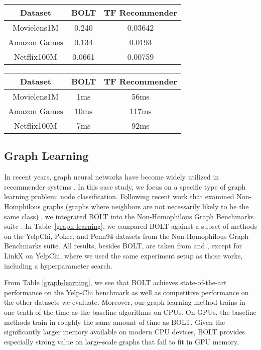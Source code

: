\documentclass[sigconf]{acmart}
\begin{document}
\begin{table}[h]
\begin{tabular}{|c|c|c|}
 \hline
 Dataset & BOLT & TF Recommender \\ \hline
 Movielens1M & 0.240 & 0.03642\\ \hline
 Amazon Games & 0.134 & 0.0193\\ \hline
 Netflix100M & 0.0661 & 0.00759\\ \hline
\end{tabular}
\label{personalization-acc}
\vspace{-1.1cm}
\end{table}
\begin{table}[h]
\begin{tabular}{|c|c|c|}
 \hline
 Dataset & BOLT & TF Recommender \\ \hline
 Movielens1M & 1ms & 56ms\\ \hline
 Amazon Games & 10ms & 117ms\\ \hline
 Netflix100M & 7ms & 92ms\\ \hline
\end{tabular}
\label{personalization-inf}
\vspace{-0.5cm}
\end{table}



\subsection{Graph Learning}
In recent years, graph neural networks have become widely utilized in recommender systems \cite{wu2022graph}. In this case study, we focus on a specific type of graph learning problem: node classification. Following recent work that examined Non-Homphilous graphs (graphs where neighbors are not necessarily likely to be the same class) \cite{lim2021large} \cite{lim2021new}, we integrated BOLT into the Non-Homophilous Graph Benchmarks suite \cite{lim2021large}. In Table~\ref{graph-learning}, we compared BOLT against a subset of methods on the YelpChi, Pokec, and Penn94 datasets from the Non-Homophilous Graph Benchmarks suite. All results, besides BOLT, are taken from \cite{lim2021large} and \cite{lim2021new}, except for LinkX on YelpChi, where we used the same experiment setup as those works, including a hyperparameter search. 

From Table \ref{graph-learning}, we see that BOLT achieves state-of-the-art performance on the Yelp-Chi benchmark as well as competitive performance on the other datasets we evaluate. Moreover, our graph learning method trains in one tenth of the time as the baseline algorithms on CPUs. On GPUs, the baseline methods train in roughly the same amount of time as BOLT. Given the significantly larger memory available on modern CPU devices, BOLT provides especially strong value on large-scale graphs that fail to fit in GPU memory.
\end{document}
